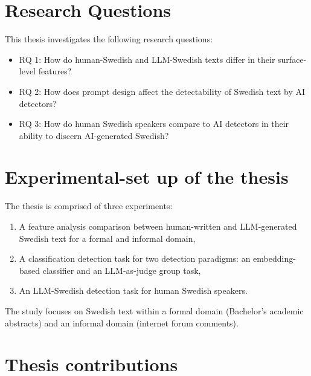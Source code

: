 \documentclass[thesis]{cluu}
\begin{document}
\section{Research Questions}
This thesis investigates the following research questions:
\begin{itemize}
    
\item RQ 1: How do human-Swedish and LLM-Swedish texts differ in their surface-level features?

\item RQ 2: How does prompt design affect the detectability of Swedish text by AI detectors?

\item RQ 3: How do human Swedish speakers compare to AI detectors in their ability to discern AI-generated Swedish?

\end{itemize}

\section{Experimental-set up of the thesis}

The thesis is comprised of three experiments:

\begin{enumerate}
    \item A feature analysis comparison between human-written and LLM-generated Swedish text for a formal and informal domain,
    \item A classification detection task for two detection paradigms: an embedding-based classifier and an LLM-as-judge group task,
    \item An LLM-Swedish detection task for human Swedish speakers.
\end{enumerate}

The study focuses on Swedish text within a formal domain (Bachelor's academic abstracts) and an informal domain (internet forum comments).

\section{Thesis contributions}
\end{document}
